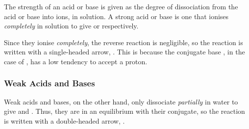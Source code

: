 				The strength of an acid or base is given as the degree of dissociation from the acid or base into ions, in solution. A strong
				acid or base is one that ionises \textit{completely} in solution to give  or  respectively.


				Since they ionise \textit{completely}, the reverse reaction is negligible, so the reaction is written with a single-headed
				arrow, \ch{->}. This is because the conjugate base \ch{\Cl-}, in the case of , has a low tendency to
				accept a proton.



			\pagebreak
			\subsubsection{Weak Acids and Bases}

				Weak acids and bases, on the other hand, only dissociate \textit{partially} in water to give  and . Thus, they
				are in an equilibrium with their conjugate, so the reaction is written with a double-headed arrow, \ch{>=<}.



